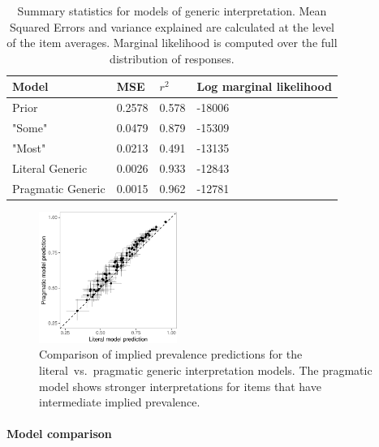 \documentclass[floatsintext,doc]{apa6}
\let\oldparagraph\paragraph
\renewcommand{\paragraph}[1]{\oldparagraph{#1}\mbox{}}
\begin{document}
\begin{table}[h]
\centering
\begingroup\fontsize{10pt}{11pt}\selectfont
\begin{tabular}{llll}
  \hline
Model & MSE & $r^2$ & Log marginal likelihood \\ 
  \hline
Prior & 0.2578 & 0.578 & -18006 \\ 
  "Some" & 0.0479 & 0.879 & -15309 \\ 
  "Most" & 0.0213 & 0.491 & -13135 \\ 
  Literal Generic & 0.0026 & 0.933 & -12843 \\ 
  Pragmatic Generic & 0.0015 & 0.962 & -12781 \\ 
   \hline
\end{tabular}
\endgroup
\caption{Summary statistics for models of generic interpretation. Mean Squared Errors and variance explained are calculated at the level of the item averages. Marginal likelihood is computed over the full distribution of responses.} 
\end{table}

\begin{figure}
\centering 
\includegraphics[width=0.4\textwidth]{genint_files/figure-latex/genint-litPrag-scatter-1} 
\caption{Comparison of implied prevalence predictions for the literal~vs.~pragmatic generic interpretation models. The pragmatic model shows stronger interpretations for items that have intermediate implied prevalence.}
\label{fig:genint-litPrag-scatter}
\end{figure}


\hypertarget{model-comparison}{%
\paragraph{Model comparison}\label{model-comparison}}
\end{document}
